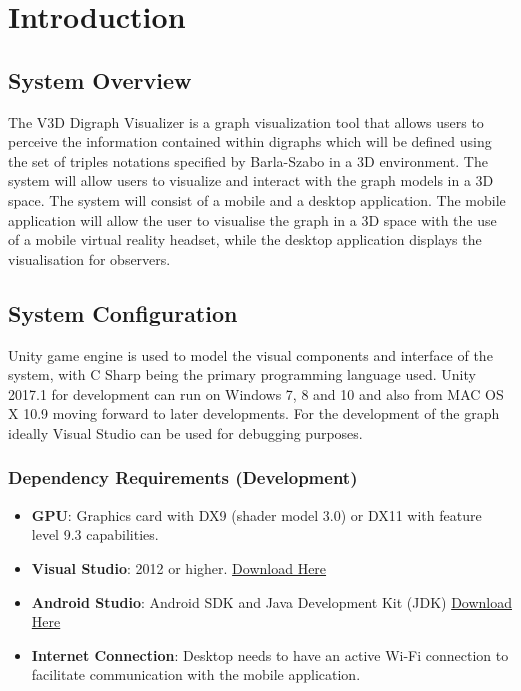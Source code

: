 \documentclass[english]{article}
\begin{document}


\newpage
{}
\thispagestyle{empty}
\tableofcontents
\clearpage

\setcounter{page}{1}

\section{Introduction}
\subsection{System Overview}
The V3D Digraph Visualizer is a graph visualization tool that allows users to perceive the information contained within digraphs which will be defined using the set of triples notations specified by Barla-Szabo in a 3D environment. The system will allow users to visualize and interact with the graph models in a 3D space. The system will consist of a mobile and a desktop application. The mobile application will allow the user to visualise the graph in a 3D space with the use of a mobile virtual reality headset, while the desktop application displays the visualisation for observers.

\subsection{System Configuration}
Unity game engine is used to model the visual components and interface of the system, with C Sharp being the primary programming language used. Unity 2017.1 for development can run on Windows 7, 8 and 10 and also from MAC OS X 10.9 moving forward to later developments. For the development of the graph ideally Visual Studio can be used for debugging purposes.

\subsubsection{Dependency Requirements (Development)} 

\begin{itemize}
	\item \textbf{GPU}: Graphics card with DX9 (shader model 3.0) or DX11 with feature level 9.3 capabilities.
	\item \textbf{Visual Studio}: 2012 or higher. \href{https://www.visualstudio.com/downloads/}{Download Here}
	\item \textbf{Android Studio}: Android SDK and Java Development Kit (JDK) \href{https://developer.android.com/studio/index.html}{Download Here}
	\item \textbf{Internet Connection}: Desktop needs to have an active Wi-Fi connection to facilitate communication with the mobile application.
	
\end{itemize}
\end{document}
